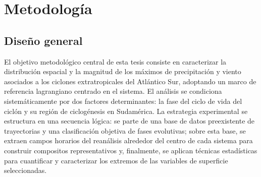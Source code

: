 \chapter{Metodología}\label{ch:metodologia}


\section{Diseño general}\label{sec:diseno_general}

El objetivo metodológico central de esta tesis consiste en caracterizar la distribución espacial y la magnitud de los máximos de precipitación y viento asociados a los ciclones extratropicales del Atlántico Sur, adoptando un marco de referencia lagrangiano centrado en el sistema. El análisis se condiciona sistemáticamente por dos factores determinantes: la fase del ciclo de vida del ciclón y su región de ciclogénesis en Sudamérica. La estrategia experimental se estructura en una secuencia lógica: se parte de una base de datos preexistente de trayectorias y una clasificación objetiva de fases evolutivas; sobre esta base, se extraen campos horarios del reanálisis alrededor del centro de cada sistema para construir compositos representativos y, finalmente, se aplican técnicas estadísticas para cuantificar y caracterizar los extremos de las variables de superficie seleccionadas.


